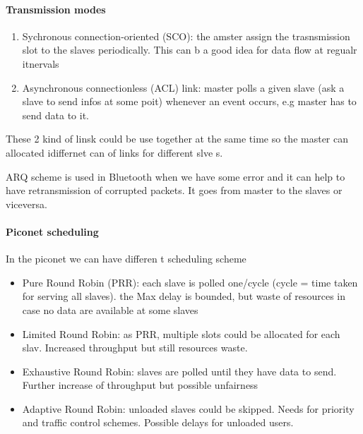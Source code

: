 \paragraph{Transmission modes}
\begin{enumerate}
\item Sychronous connection-oriented (SCO): the amster assign the trasnsmission slot to the slaves periodically. This can b a good idea for data flow at regualr itnervals
\item Asynchronous connectionless (ACL) link: master polls a given slave (ask a slave to send infos at some poit) whenever an event occurs, e.g master has to send data to it.
\end{enumerate}
These 2 kind of linsk could be use together at the same time so the master can allocated idiffernet can of links for different slve s.

ARQ scheme is used in Bluetooth when we have some error and it can help to have retransmission of corrupted packets. It goes from master to the slaves or viceversa.

\paragraph{Piconet scheduling}
In the piconet we can have differen t scheduling scheme
\begin{itemize}
\item Pure Round Robin (PRR): each slave is polled one/cycle (cycle = time taken for serving all slaves). the Max delay is bounded, but waste of resources in case no data are available at some slaves
\item Limited Round Robin: as PRR, multiple slots could be allocated for each slav. Increased throughput but still resources waste.
\item Exhaustive Round Robin: slaves are polled until they have data to send. Further increase of throughput but possible unfairness
\item Adaptive Round Robin: unloaded slaves could be skipped. Needs for priority and traffic control schemes. Possible delays for unloaded users.
\end{itemize}


